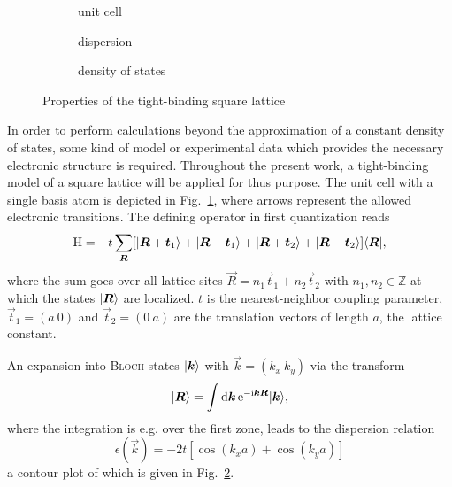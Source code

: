 \begin{figure}
    \small
    \begin{subfigure}[b]{4.666cm}
        \centering
        
        \caption{unit cell}
        \label{square-lattice unit cell}
    \end{subfigure}%
    \begin{subfigure}[b]{4.666cm}
        
        \caption{dispersion}
        \label{square-lattice dispersion}
    \end{subfigure}%
    \begin{subfigure}[b]{4.666cm}
        
        \caption{density of states}
        \label{square-lattice dos}
    \end{subfigure}
    \caption{Properties of the tight-binding square lattice}
\end{figure}
%
In order to perform calculations beyond the approximation of a constant density
of states, some kind of model or experimental data which provides the necessary
electronic structure is required. Throughout the present work, a tight-binding
model of a square lattice will be applied for thus purpose. The unit cell with a
single basis atom is depicted in Fig.~\ref{square-lattice unit cell}, where
arrows represent the allowed electronic transitions. The defining
 operator in first quantization reads
%
\begin{equation*}
    \mathrm H = -t \sum_{\boldsymbol R}
         [ |\boldsymbol R + \boldsymbol t_1\rangle
         + |\boldsymbol R - \boldsymbol t_1\rangle
         + |\boldsymbol R + \boldsymbol t_2\rangle
         + |\boldsymbol R - \boldsymbol t_2\rangle ]
    \langle\boldsymbol R|,
\end{equation*}
%
where the sum goes over all lattice sites $\vec R = n_1 \vec t_1 + n_2 \vec t_2$
with $n_1, n_2 \in \mathds Z$ at which the  states $|\boldsymbol R\rangle$
are localized. $t$ is the nearest-neighbor coupling parameter, $\vec t_1 = (a \
0)$ and $\vec t_2 = (0 \ a)$ are the translation vectors of length $a$, the
lattice constant.

An expansion into \textsc{Bloch} states $|\boldsymbol k\rangle$ with $\vec k = (k_x \
k_y)$ via the  transform
%
\begin{equation*}
    |\boldsymbol R\rangle = \int \mathrm d \boldsymbol k \, \mathrm e^{-\mathrm i \boldsymbol k \boldsymbol R} |\boldsymbol k\rangle,
\end{equation*}
%
where the integration is e.g. over the first  zone, leads to the
dispersion relation
%
\begin{equation*}
    \epsilon(\vec k) = -2 t [\cos(k_x a) + \cos(k_y a)]
\end{equation*}
%
a contour plot of which is given in Fig.~\ref{square-lattice dispersion}.

